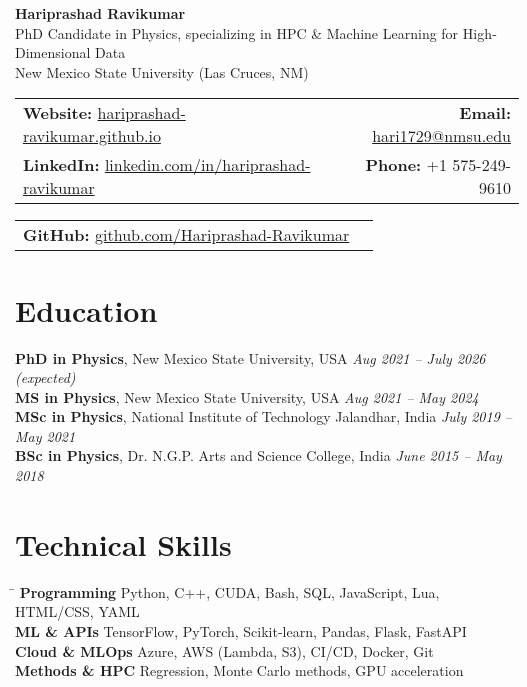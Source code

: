\documentclass[11pt]{article}
\begin{document}
\begin{center}
  \textbf{\Huge Hariprashad Ravikumar} \\[0.6em]
  \vspace{0.5em}
  PhD Candidate in Physics, specializing in HPC \& Machine Learning for High‐Dimensional Data \\
  New Mexico State University (Las Cruces, NM)\\[0.4em]
\end{center}

\begin{tabularx}{\textwidth}{@{}Xr@{}}
    \textbf{Website:} \href{https://hariprashad-ravikumar.github.io}{hariprashad-ravikumar.github.io} & \textbf{Email:} \href{mailto:hari1729@nmsu.edu}{hari1729@nmsu.edu}  \\
    \textbf{LinkedIn:} \href{https://www.linkedin.com/in/hariprashad-ravikumar}{linkedin.com/in/hariprashad-ravikumar} & \textbf{Phone:} +1 575-249-9610 
\end{tabularx}
\vspace{-1em}
\begin{tabularx}{\textwidth}{@{}Xr@{}}
\textbf{GitHub:} \href{https://github.com/Hariprashad-Ravikumar}{github.com/Hariprashad-Ravikumar}  \\
\end{tabularx}

\vspace{0.5em}
\section*{Education}
\vspace{0.3em}

\textbf{PhD in Physics}, New Mexico State University, USA \hfill \textit{Aug 2021 – July 2026 (expected)} \\
\textbf{MS in Physics}, New Mexico State University, USA \hfill \textit{Aug 2021 – May 2024} \\
\textbf{MSc in Physics}, National Institute of Technology Jalandhar, India \hfill \textit{July 2019 – May 2021} \\
\textbf{BSc in Physics}, Dr. N.G.P. Arts and Science College, India \hfill \textit{June 2015 – May 2018}


\section*{Technical Skills}
\vspace{-0.3em}
\begin{tabbing}
\hspace{3.5cm} \= \kill
\textbf{Programming} \> Python, C++, CUDA, Bash, SQL, JavaScript, Lua, HTML/CSS, YAML \\
\textbf{ML \& APIs} \> TensorFlow, PyTorch, Scikit-learn, Pandas, Flask, FastAPI\\
\textbf{Cloud \& MLOps} \> Azure, AWS (Lambda, S3), CI/CD, Docker, Git\\
\textbf{Methods \& HPC} \> Regression, Monte Carlo methods, GPU acceleration
\end{tabbing}
\end{document}

